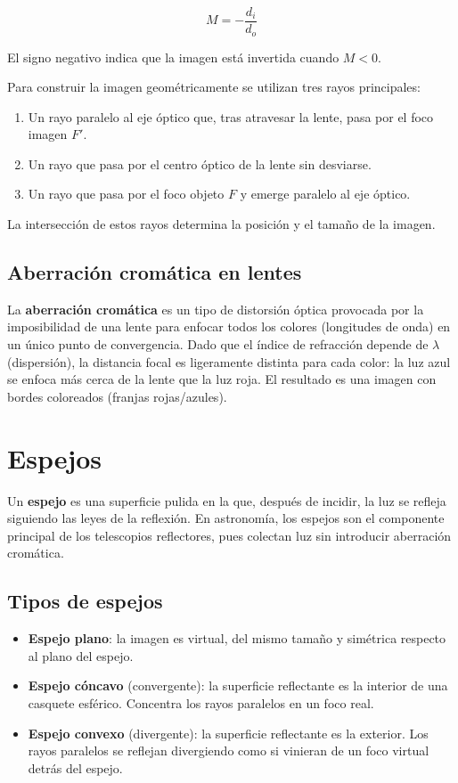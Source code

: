 $$M = -\frac{d_i}{d_o}$$

El signo negativo indica que la imagen está invertida cuando $M<0$.

Para construir la imagen geométricamente se utilizan tres rayos principales:
\begin{enumerate}
    \item Un rayo paralelo al eje óptico que, tras atravesar la lente, pasa por el foco imagen $F'$.
    \item Un rayo que pasa por el centro óptico de la lente sin desviarse.
    \item Un rayo que pasa por el foco objeto $F$ y emerge paralelo al eje óptico.
\end{enumerate}

La intersección de estos rayos determina la posición y el tamaño de la imagen.



\subsection{Aberración cromática en lentes}

La \textbf{aberración cromática} es un tipo de distorsión óptica provocada por la imposibilidad de una lente para enfocar todos los colores (longitudes de onda) en un único punto de convergencia. Dado que el índice de refracción depende de $\lambda$ (dispersión), la distancia focal es ligeramente distinta para cada color: la luz azul se enfoca más cerca de la lente que la luz roja. El resultado es una imagen con bordes coloreados (franjas rojas/azules).



\section{Espejos}

Un \textbf{espejo} es una superficie pulida en la que, después de incidir, la luz se refleja siguiendo las leyes de la reflexión. En astronomía, los espejos son el componente principal de los telescopios reflectores, pues colectan luz sin introducir aberración cromática.

\subsection{Tipos de espejos}

\begin{itemize}
    \item \textbf{Espejo plano}: la imagen es virtual, del mismo tamaño y simétrica respecto al plano del espejo.
    \item \textbf{Espejo cóncavo} (convergente): la superficie reflectante es la interior de una casquete esférico. Concentra los rayos paralelos en un foco real.
    \item \textbf{Espejo convexo} (divergente): la superficie reflectante es la exterior. Los rayos paralelos se reflejan divergiendo como si vinieran de un foco virtual detrás del espejo.
\end{itemize}

